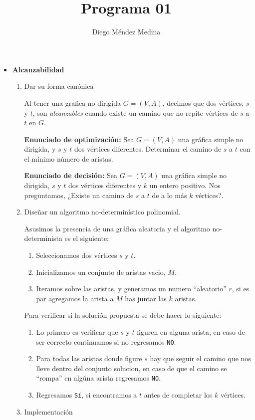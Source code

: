 \documentclass[14pt,letterpaper]{article}
\title{Programa 01}
\author{Diego Méndez Medina}
\date{}
\begin{document}
\ttfamily
\maketitle
\rmfamily

\begin{itemize}
\item {\bf Alcanzabilidad}
  \begin{enumerate}
  \item Dar su forma canónica

    Al tener una grafica no dirigida $G=(V,A)$, decimos que dos
    vértices, $s$ y $t$, son {\it alcanzables} cuando existe
    un camino que no repite vértices de $s$ a $t$ en $G$.

    {\bf Enunciado de optimización:} Sea $G=(V,A)$ una gráfica simple no dirigida,
    y $s$ y $t$ dos vértices diferentes.  Determinar el camino
    de $s$ a $t$ con el mínimo número de aristas.

    {\bf Enunciado de decisión:} Sea $G=(V,A)$ una gráfica simple no dirigida,
    $s$ y $t$ dos vértices diferentes y $k$ un entero positivo. Nos preguntamos, ¿Existe
    un camino de $s$ a $t$ de a lo más $k$ vértices?.
    
  \item Diseñar un algoritmo no-determinístico polinomial.

    Asusimos la presencia de una gráfica aleatoria y el algoritmo
    no-determinista es el siguiente:

    \begin{enumerate}
    \item Seleccionamos dos vértices $s$ y $t$.
    \item Inicializamos un conjunto de aristas vacio, $M$.
    \item Iteramos sobre las aristas, y generamos
      un numero ``aleatorio'' $r$, si es par agregamos
      la arista a $M$ has juntar las $k$ aristas.
    \end{enumerate}
    
    Para verificar si la solución propuesta se debe hacer lo siguiente:

    \begin{enumerate}
    \item Lo primero es verificar que $s$ y $t$ figuren en alguna arista, en caso
      de ser correcto continuamos si no regresamos {\tt NO}.
    \item Para todas las aristas donde figure $s$ hay que seguir el camino
      que nos lleve dentro del conjunto solucion, en caso de que el camino
      se ``rompa'' en algúna arista regresamos {\tt NO}.
    \item Regresamos {\tt Sí}, si encontramos a $t$ antes de completar los $k$
      vértices.
    \end{enumerate}
  \item Implementación


\end{enumerate}
\end{itemize}
\end{document}
